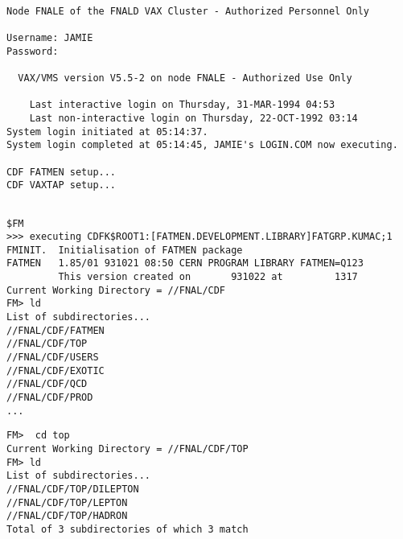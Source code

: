 \begin{slide}
\begin{footnotesize}
\begin{verbatim}

Node FNALE of the FNALD VAX Cluster - Authorized Personnel Only

Username: JAMIE
Password: 

  VAX/VMS version V5.5-2 on node FNALE - Authorized Use Only

    Last interactive login on Thursday, 31-MAR-1994 04:53
    Last non-interactive login on Thursday, 22-OCT-1992 03:14
System login initiated at 05:14:37.
System login completed at 05:14:45, JAMIE's LOGIN.COM now executing.

CDF FATMEN setup...
CDF VAXTAP setup...

\end{verbatim}
\end{footnotesize}
\end{slide}

\begin{slide}

\begin{footnotesize}
\begin{verbatim}

$FM
>>> executing CDFK$ROOT1:[FATMEN.DEVELOPMENT.LIBRARY]FATGRP.KUMAC;1
FMINIT.  Initialisation of FATMEN package
FATMEN   1.85/01 931021 08:50 CERN PROGRAM LIBRARY FATMEN=Q123
         This version created on       931022 at         1317
Current Working Directory = //FNAL/CDF
FM> ld
List of subdirectories...
//FNAL/CDF/FATMEN
//FNAL/CDF/TOP
//FNAL/CDF/USERS
//FNAL/CDF/EXOTIC
//FNAL/CDF/QCD
//FNAL/CDF/PROD
...
\end{verbatim}
\end{footnotesize}
\end{slide}
\begin{slide}
\begin{footnotesize}
\begin{verbatim}
FM>  cd top
Current Working Directory = //FNAL/CDF/TOP
FM> ld
List of subdirectories...
//FNAL/CDF/TOP/DILEPTON
//FNAL/CDF/TOP/LEPTON
//FNAL/CDF/TOP/HADRON
Total of 3 subdirectories of which 3 match
\end{verbatim}
\end{footnotesize}
\end{slide}

